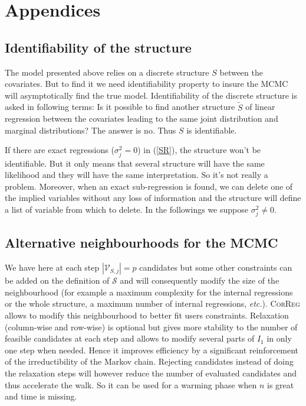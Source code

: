\documentclass[11pt,a4paper]{article}
\begin{document}
\section{Appendices}
	\subsection{Identifiability of the structure}
	The model presented above relies on a discrete structure $S$ between the covariates. But to find it we need identifiability property to insure the MCMC will asymptotically find the true model. Identifiability of the discrete structure is asked in following terms: Is it possible to find another structure $\tilde{S}$ of linear regression between the covariates leading to the same joint distribution and marginal distributions? The answer is no. Thus $S$ is identifiable.
	
	
	If there are exact regressions ($\sigma^2_j=0$) in (\ref{SR}), the structure won't be identifiable. But it only means that several structure will have the same likelihood and they will have the same interpretation. So it's not really a problem. Moreover, when an exact sub-regression is found, we can delete one of the implied variables without any loss of information and the structure will define a list of variable from which to delete. %
	In the followings we suppose $\sigma^2_j\neq 0$.
	
	
\subsection{Alternative neighbourhoods for the MCMC}
	We have here at each step $|\mathcal{V}_{S,j}|=p$ candidates but some other constraints can be added on the definition of $\mathcal{S}$ and will consequently modify the size of the neighbourhood (for example a maximum complexity for the internal regressions or the whole structure, a maximum number of internal regressions, {\it etc.}). \textsc{CorReg} allows to modify this neighbourhood to better fit users constraints. Relaxation (column-wise and row-wise) is optional but gives more stability to the number of feasible candidates at each step and allows to modify several parts of $I_1$ in only one step when needed. Hence it improves efficiency by a significant reinforcement of the irreductibility of the Markov chain. Rejecting candidates instead of doing the relaxation steps will  however reduce the number of evaluated candidates and thus accelerate the walk. So it can be used for a warming phase when $n$ is great and time is missing.
	
\end{document}
